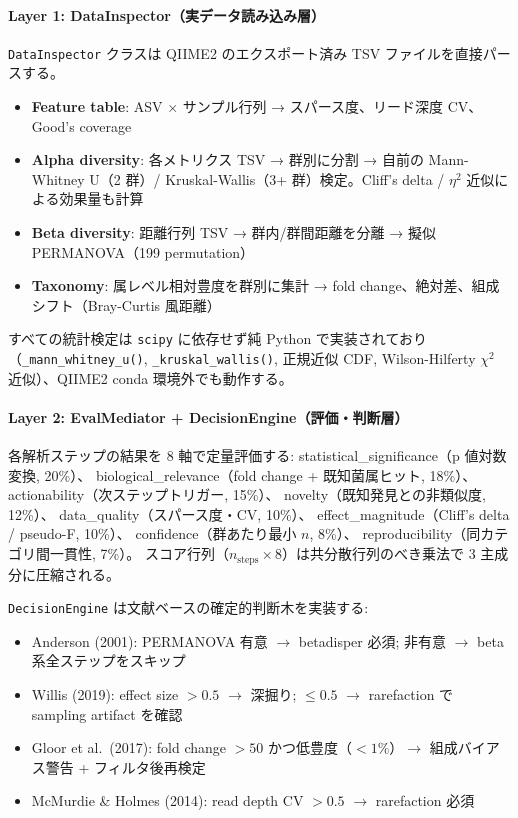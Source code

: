 \documentclass[12pt, a4paper]{article}
\begin{document}
\paragraph{Layer 1: DataInspector（実データ読み込み層）}
\texttt{DataInspector} クラスは QIIME2 のエクスポート済み TSV ファイルを直接パースする。
\begin{itemize}
  \item \textbf{Feature table}: ASV $\times$ サンプル行列 → スパース度、リード深度 CV、Good's coverage
  \item \textbf{Alpha diversity}: 各メトリクス TSV → 群別に分割 → 自前の Mann-Whitney U（2 群）/ Kruskal-Wallis（3+ 群）検定。Cliff's delta / $\eta^2$ 近似による効果量も計算
  \item \textbf{Beta diversity}: 距離行列 TSV → 群内/群間距離を分離 → 擬似 PERMANOVA（199 permutation）
  \item \textbf{Taxonomy}: 属レベル相対豊度を群別に集計 → fold change、絶対差、組成シフト（Bray-Curtis 風距離）
\end{itemize}
すべての統計検定は \texttt{scipy} に依存せず純 Python で実装されており（\texttt{\_mann\_whitney\_u()}, \texttt{\_kruskal\_wallis()}, 正規近似 CDF, Wilson-Hilferty $\chi^2$ 近似）、QIIME2 conda 環境外でも動作する。

\paragraph{Layer 2: EvalMediator + DecisionEngine（評価・判断層）}
各解析ステップの結果を 8 軸で定量評価する:
statistical\_significance（p 値対数変換, 20\%）、
biological\_relevance（fold change + 既知菌属ヒット, 18\%）、
actionability（次ステップトリガー, 15\%）、
novelty（既知発見との非類似度, 12\%）、
data\_quality（スパース度・CV, 10\%）、
effect\_magnitude（Cliff's delta / pseudo-F, 10\%）、
confidence（群あたり最小 $n$, 8\%）、
reproducibility（同カテゴリ間一貫性, 7\%）。
スコア行列（$n_{\mathrm{steps}} \times 8$）は共分散行列のべき乗法で 3 主成分に圧縮される。

\texttt{DecisionEngine} は文献ベースの確定的判断木を実装する:
\begin{itemize}
  \item Anderson (2001): PERMANOVA 有意 $\rightarrow$ betadisper 必須; 非有意 $\rightarrow$ beta 系全ステップをスキップ
  \item Willis (2019): effect size $> 0.5$ $\rightarrow$ 深掘り; $\leq 0.5$ $\rightarrow$ rarefaction で sampling artifact を確認
  \item Gloor et al.\ (2017): fold change $> 50$ かつ低豊度（$< 1\%$）$\rightarrow$ 組成バイアス警告 + フィルタ後再検定
  \item McMurdie \& Holmes (2014): read depth CV $> 0.5$ $\rightarrow$ rarefaction 必須
\end{itemize}
\end{document}
